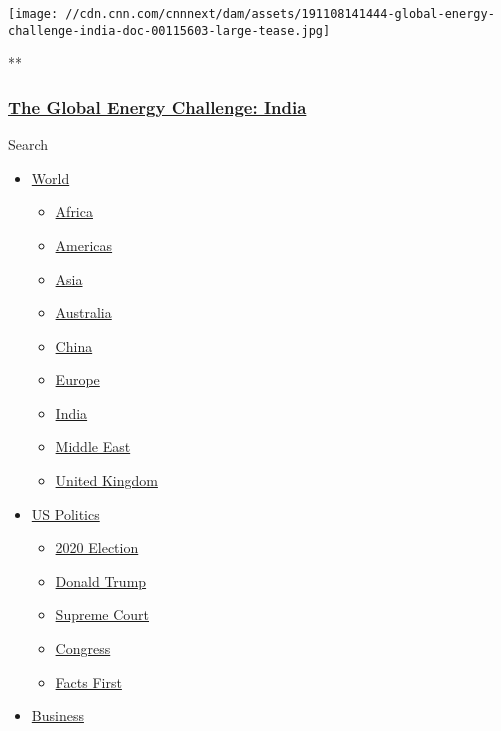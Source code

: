 \href{/videos/business/2019/11/08/global-energy-challenge-india-doc.cnn}{}

\texttt{[image: //cdn.cnn.com/cnnnext/dam/assets/191108141444-global-energy-challenge-india-doc-00115603-large-tease.jpg]}

**

\hypertarget{the-global-energy-challenge-india}{%
\subsubsection{\texorpdfstring{\href{/videos/business/2019/11/08/global-energy-challenge-india-doc.cnn}{The
Global Energy Challenge:
India}}{The Global Energy Challenge: India}}\label{the-global-energy-challenge-india}}

Search

\begin{itemize}
\tightlist
\item
  \href{/world}{World}

  \begin{itemize}
  \tightlist
  \item
    \href{/africa}{Africa}
  \item
    \href{/americas}{Americas}
  \item
    \href{/asia}{Asia}
  \item
    \href{/australia}{Australia}
  \item
    \href{/china}{China}
  \item
    \href{/europe}{Europe}
  \item
    \href{/india}{India}
  \item
    \href{/middle-east}{Middle East}
  \item
    \href{/uk}{United Kingdom}
  \end{itemize}
\item
  \href{/politics}{US Politics}

  \begin{itemize}
  \tightlist
  \item
    \href{/election/2020}{2020 Election}
  \item
    \href{/specials/politics/president-donald-trump-45}{Donald Trump}
  \item
    \href{/specials/politics/supreme-court-nine}{Supreme Court}
  \item
    \href{/specials/politics/congress}{Congress}
  \item
    \href{/specials/politics/fact-check-politics}{Facts First}
  \end{itemize}
\item
  \href{/business}{Business}


\end{itemize}
